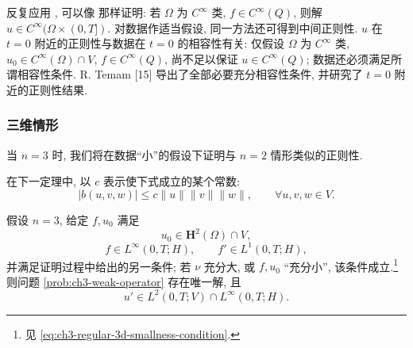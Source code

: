 \hypertarget{chapter-03-page-220}{}
\begin{Remark}
\label{rem:ch3-regular-compatibility}
反复应用 , 可以像  那样证明: 若 $\Omega$ 为 $C^\infty$ 类, $f\in C^\infty(Q)$, 则解 $u\in C^\infty(\Omega\times(0,T])$. 对数据作适当假设, 同一方法还可得到中间正则性. $u$ 在 $t=0$ 附近的正则性与数据在 $t=0$ 的相容性有关: 仅假设 $\Omega$ 为 $C^\infty$ 类, $u_0\in C^\infty(\Omega)\cap V$, $f\in C^\infty(Q)$, 尚不足以保证 $u\in C^\infty(Q)$; 数据还必须满足所谓相容性条件. R. Temam [15] 导出了全部必要充分相容性条件, 并研究了 $t=0$ 附近的正则性结果.
\end{Remark}

\subsubsection{三维情形}
\label{subsubsec:ch3-more-regular-3d}
当 $n=3$ 时, 我们将在数据“小”的假设下证明与 $n=2$ 情形类似的正则性.

在下一定理中, 以 $c$ 表示使下式成立的某个常数:
\begin{equation}
|b(u,v,w)|\leq c\lVert u\rVert\lVert v\rVert\lVert w\rVert,
\qquad\forall u,v,w\in V.
\label{eq:ch3-regular-3d-trilinear-v-bound}
\end{equation}

\begin{Theorem}
\label{thm:ch3-more-regular-3d}
假设 $n=3$, 给定 $f,u_0$ 满足
\begin{equation}
u_0\in\mathbf H^2(\Omega)\cap V,
\label{eq:ch3-regular-3d-initial-assumption}
\end{equation}
\begin{equation}
f\in L^\infty(0,T;H),
\qquad f'\in L^1(0,T;H),
\label{eq:ch3-regular-3d-force-assumptions}
\end{equation}
并满足证明过程中给出的另一条件; 若 $\nu$ 充分大, 或 $f,u_0$ “充分小”, 该条件成立.\footnote{见 \eqref{eq:ch3-regular-3d-smallness-condition}.} 则问题 \ref{prob:ch3-weak-operator} 存在唯一解, 且
\begin{equation}
u'\in L^2(0,T;V)\cap L^\infty(0,T;H).
\label{eq:ch3-regular-3d-time-regularity}
\end{equation}
\end{Theorem}

